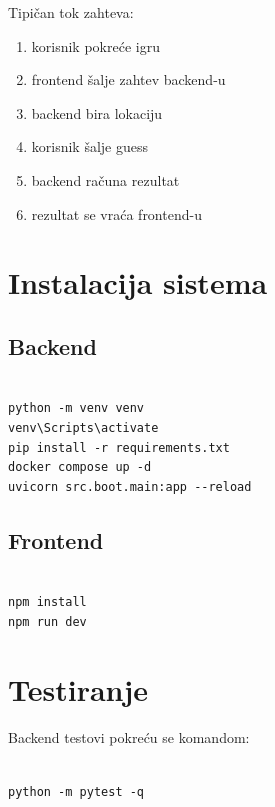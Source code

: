 \documentclass[a4paper,12pt,projekat]{etf}
\begin{document}
Tipičan tok zahteva:

\begin{enumerate}

\item korisnik pokreće igru
\item frontend šalje zahtev backend-u
\item backend bira lokaciju
\item korisnik šalje guess
\item backend računa rezultat
\item rezultat se vraća frontend-u

\end{enumerate}


\chapter{Instalacija sistema}

\section{Backend}

\begin{verbatim}

python -m venv venv
venv\Scripts\activate
pip install -r requirements.txt
docker compose up -d
uvicorn src.boot.main:app --reload

\end{verbatim}

\section{Frontend}

\begin{verbatim}

npm install
npm run dev

\end{verbatim}


\chapter{Testiranje}

Backend testovi pokreću se komandom:

\begin{verbatim}

python -m pytest -q

\end{verbatim}
\end{document}
